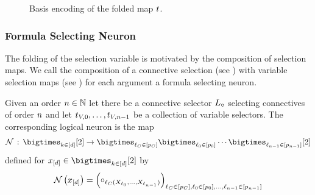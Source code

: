 \begin{figure}[t]
    \begin{center}
        
    \end{center}
    \caption{Basis encoding of the folded map $t$.}
    \label{fig:foldedSelector}
\end{figure}




\subsubsection{Formula Selecting Neuron}


The folding of the selection variable is motivated by the composition of selection maps.
We call the composition of a connective selection (see ) with variable selection maps (see ) for each argument a formula selecting neuron.


\begin{definition}
    \label{def:fsNeuron}
    Given an order $n\in\mathbb{N}$ let there be a connective selector $L_{\circ}$ selecting connectives of order $n$ and let $t_{V,0},\ldots,t_{V,n-1}$ be a collection of variable selectors.
    The corresponding logical neuron is the map
    \begin{align*}
        \lneuron\defcols\atomstates \rightarrow \bigtimes_{\selindexofin{\cselectionsymbol}} \bigtimes_{\selindexofin{0}} \cdots \bigtimes_{\selindexofin{\selorder-1}} [2]
    \end{align*}
    defined for $\shortcatindices\in\atomstates$ by
    \begin{align*}
        \mathcal{N}\left(x_{[d]}\right)
        = \left( \circ_{\ell_{C}(X_{\ell_{0}},\ldots,X_{\ell_{n-1}})}\right)_{\ell_{C}\in[p_{C}],\ell_{0}\in[p_{0}],\ldots,\ell_{n-1}\in[p_{n-1}]}
    \end{align*}
\end{definition}

